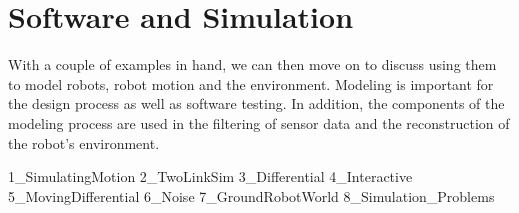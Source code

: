 \hypertarget{Chap:Simulation}{%
\section{Software and Simulation}\label{Chap:Simulation}}

With a couple of examples in hand, we can then move on to discuss using
them to model robots, robot motion and the environment. Modeling is
important for the design process as well as software testing. In
addition, the components of the modeling process are used in the
filtering of sensor data and the reconstruction of the robot's
environment.

1\_SimulatingMotion 2\_TwoLinkSim 3\_Differential 4\_Interactive
5\_MovingDifferential 6\_Noise 7\_GroundRobotWorld
8\_Simulation\_Problems
